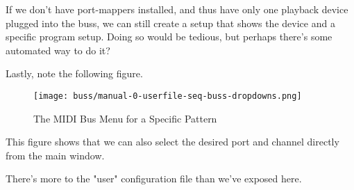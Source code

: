    If we don't have port-mappers installed, and thus have only one playback
   device plugged into the buss, we can still create a setup that
   shows the device and a specific program setup.  Doing so would be tedious,
   but perhaps there's some automated way to do it?

   Lastly, note the following figure.

\begin{figure}[H]
   \centering 
   \texttt{[image: buss/manual-0-userfile-seq-buss-dropdowns.png]}
   \caption{The MIDI Bus Menu for a Specific Pattern}
   \label{fig:seq64_manual_0_userfile_seq_buss_dropdown}
\end{figure}

   This figure shows that we can also select the desired port and channel
   directly from the main window.

   There's more to the "user" configuration file than we've exposed here.



